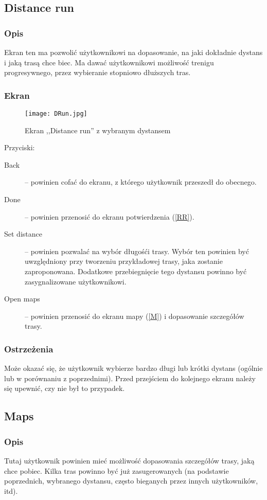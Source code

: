 \subsection{Distance run}
\subsubsection{Opis}
\noindent Ekran ten ma pozwolić użytkownikowi na dopasowanie, na jaki dokładnie dystans i jaką trasą chce biec. Ma dawać użytkownikowi możliwość trenigu progresywnego, przez wybieranie stopniowo dłuższych tras.
\subsubsection{Ekran}
\begin{figure}[b!]
  \texttt{[image: DRun.jpg]}
  \caption{Ekran ,,Distance run'' z wybranym dystansem}
  \label{DR}
\end{figure}
Przyciski:\\
\begin{description}
  \item[Back] -- powinien cofać do ekranu, z którego użytkownik przeszedł do obecnego.
  \item[Done] -- powinien przenosić do ekranu potwierdzenia (\ref{RR}).
  \item[Set distance] -- powinien pozwalać na wybór długośći trasy. Wybór ten powinien być uwzględniony przy tworzeniu przykładowej trasy, jaka zostanie zaproponowana. Dodatkowe przebiegnięcie tego dystansu powinno być zasygnalizowane użytkownikowi.
  \item[Open maps] -- powinien przenosić do ekranu mapy (\ref{M}) i dopasowanie szczegółów trasy.
\end{description}
\subsubsection{Ostrzeżenia}
\noindent Może okazać się, że użytkownik wybierze bardzo długi lub krótki dystans (ogólnie lub w porównaniu z poprzednimi). Przed przejściem do kolejnego ekranu należy się upewnić, czy nie był to przypadek.
\subsection{Maps}
\subsubsection{Opis}
\noindent Tutaj użytkownik powinien mieć możliwość dopasowania szczegółów trasy, jaką chce pobiec. Kilka tras powinno być już zasugerowanych (na podstawie poprzednich, wybranego dystansu, często bieganych przez innych użytkowników, itd).
